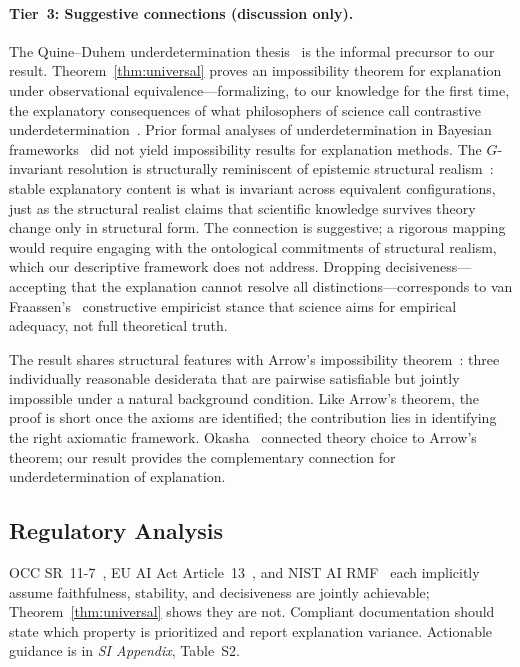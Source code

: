 \documentclass[twocolumn]{article}
\begin{document}
\paragraph{Tier~3: Suggestive connections (discussion only).}
The Quine--Duhem underdetermination thesis~\cite{quine1951dogmas,
duhem1906aim} is the informal precursor to our result.
Theorem~\ref{thm:universal} proves an impossibility theorem for
explanation under observational equivalence---formalizing, to our
knowledge for the first time, the explanatory consequences of what
philosophers of science call contrastive
underdetermination~\cite{laudan1991empirical}. Prior formal analyses of
underdetermination in Bayesian
frameworks~\cite{dorling1979bayesian,howson2006scientific} did not yield
impossibility results for explanation methods. The $G$-invariant
resolution is structurally reminiscent of epistemic structural
realism~\cite{worrall1989structural}: stable explanatory content is what
is invariant across equivalent configurations, just as the structural
realist claims that scientific knowledge survives theory change only in
structural form. The connection is suggestive; a rigorous mapping would
require engaging with the ontological commitments of structural realism,
which our descriptive framework does not address. Dropping
decisiveness---accepting that the explanation cannot resolve all
distinctions---corresponds to van Fraassen's~\cite{vanfraassen1980scientific}
constructive empiricist stance that science aims for empirical adequacy,
not full theoretical truth.

The result shares structural features with Arrow's impossibility
theorem~\cite{arrow1951social}: three individually reasonable desiderata
that are pairwise satisfiable but jointly impossible under a natural
background condition. Like Arrow's theorem, the proof is short once the
axioms are identified; the contribution lies in identifying the right
axiomatic framework.
Okasha~\cite{okasha2011theory} connected theory choice to Arrow's
theorem; our result provides the complementary connection for
underdetermination of explanation.

\subsection{Regulatory Analysis}

OCC SR~11-7~\cite{occ2011sr117}, EU AI Act Article~13~\cite{euaiact2024}, and NIST AI RMF~\cite{nistai2023} each implicitly assume faithfulness, stability, and decisiveness are jointly achievable; Theorem~\ref{thm:universal} shows they are not. Compliant documentation should state which property is prioritized and report explanation variance. Actionable guidance is in \emph{SI Appendix}, Table~S2.
\end{document}
